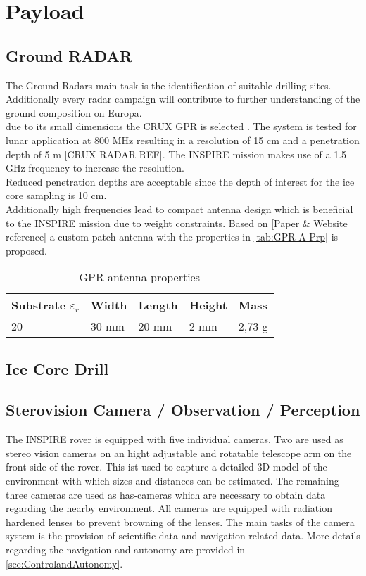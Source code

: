 
\chapter{Payload}
\label{chap:payload}

\section{Ground RADAR}
The Ground Radars main task is the identification of suitable drilling sites. Additionally every radar campaign will contribute to further understanding of the ground composition on Europa.\\

due to its small dimensions the CRUX GPR is selected . The system is tested for lunar application at 800 MHz resulting in a resolution of 15 cm and a penetration depth of 5 m [CRUX RADAR REF]. The INSPIRE mission makes use of a 1.5 GHz frequency to increase the resolution. \\
Reduced penetration depths are acceptable since the depth of interest for the ice core sampling is 10 cm. \\

Additionally high frequencies lead to compact antenna design which is beneficial to the INSPIRE mission due to weight constraints. 
Based on [Paper \& Website reference] a custom patch antenna with the properties in \autoref{tab:GPR-A-Prp} is proposed.

\begin{table}[h]
\centering
\begin{tabular}{lllll}
Substrate ${\varepsilon}_{r}$ & Width & Length & Height & Mass   \\ \hline\hline
20                         & 30 mm & 20 mm  & 2 mm   & 2,73 g  \\ \hline
\end{tabular}
\caption{GPR antenna properties}
\label{tab:GPR-A-Prp}
\end{table}

\section{Ice Core Drill}

\section{Sterovision Camera / Observation / Perception}

The INSPIRE rover is equipped with five individual cameras. Two are used as stereo vision cameras on an hight adjustable and rotatable telescope arm on the front side of the rover. This ist used to capture a detailed 3D model of the environment with which sizes and distances can be estimated. The remaining three cameras are used as has-cameras which are necessary to obtain data regarding the nearby environment. All cameras are equipped with radiation hardened lenses to prevent browning of the lenses. The main tasks of the camera system is the provision of scientific data and navigation related data. More details regarding the navigation and autonomy are provided in \autoref{sec:ControlandAutonomy}.

